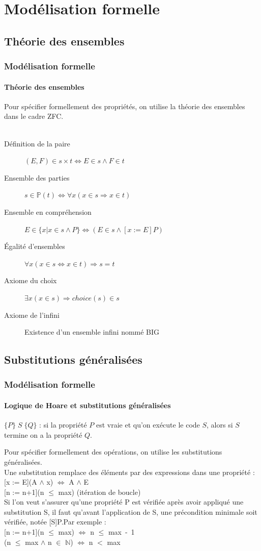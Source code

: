 \documentclass[11pt,a4paper,xcolor=table, handout]{beamer} %
\begin{document}
%
%
\frame{\tableofcontents}

\section{Modélisation formelle}
\subsection{Théorie des ensembles}
\begin{frame}
\frametitle{Modélisation formelle}
\framesubtitle{Théorie des ensembles}
Pour spécifier formellement des propriétés, on utilise la théorie des ensembles dans le cadre ZFC.
\\~\pause
\begin{description}
\item[Définition de la paire] $(E, F) \in s \times t \Leftrightarrow E \in s \wedge F \in t$
\item[Ensemble des parties] $s \in \mathbb{P}(t) \Leftrightarrow \forall x (x \in s \Rightarrow x \in t)$
\item[Ensemble en compréhension] $E \in \{ x | x \in s \wedge P \} \Leftrightarrow (E \in s \wedge [x:= E] P)$
\item[Égalité d'ensembles] $\forall x (x \in s \Leftrightarrow x \in t) \Rightarrow s = t$
\item[Axiome du choix] $\exists x  (x \in s) \Rightarrow choice(s) \in s$
\item[Axiome de l'infini] Existence d'un ensemble infini nommé BIG
\end{description}
\end{frame}

\subsection{Substitutions généralisées}
\begin{frame}
\frametitle{Modélisation formelle}
\framesubtitle{Logique de Hoare et substitutions généralisées}
\begin{definition}
$ \{P\}\;S\;\{Q\} $ : si la propriété $P$ est vraie et qu'on exécute le code $S$, alors si $S$ termine on a la propriété $Q$.
\end{definition}

Pour spécifier formellement des opérations, on utilise les substitutions généralisées.
\\\pause
Une substitution remplace des éléments par des expressions dans une propriété :\\[5pt]
[x := E](A $\wedge$ x) $\Leftrightarrow$ A $\wedge$ E\\[5pt]
[n := n+1](n $\leq$ max) (itération de boucle)
\\[10pt]\pause
Si l'on veut s'assurer qu'une propriété P est vérifiée après avoir appliqué une substitution S, il faut qu'avant l'application de S, une précondition minimale soit vérifiée, notée [S]P.\pause Par exemple :\\[5pt]
[n := n+1](n $\leq$ max) $\Leftrightarrow$ n $\leq$ max\ -\ 1\pause\\
[n := n+1](n $\leq$ max $\wedge$ n $\in$ $\mathbb{N}$) $\Leftrightarrow$ n $<$ max
\end{frame}
\end{document}
